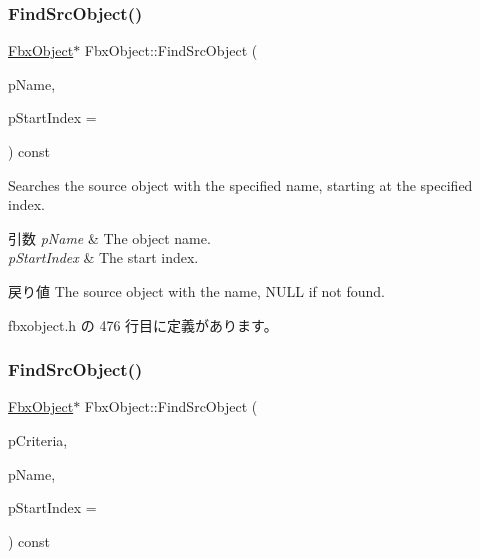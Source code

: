 \subsubsection{\texorpdfstring{Find\+Src\+Object()}{FindSrcObject()}\hspace{0.1cm}{\footnotesize\ttfamily [1/4]}}
{\footnotesize\ttfamily \hyperlink{class_fbx_object}{Fbx\+Object}$\ast$ Fbx\+Object\+::\+Find\+Src\+Object (\begin{DoxyParamCaption}\item[{const char $\ast$}]{p\+Name,  }\item[{int}]{p\+Start\+Index = {} }\end{DoxyParamCaption}) const\hspace{0.3cm}{\ttfamily [inline]}}

Searches the source object with the specified name, starting at the specified index. 
\begin{DoxyParams}{引数}
{\em p\+Name} & The object name. \\
\hline
{\em p\+Start\+Index} & The start index. \\
\hline
\end{DoxyParams}
\begin{DoxyReturn}{戻り値}
The source object with the name, N\+U\+LL if not found. 
\end{DoxyReturn}


 fbxobject.\+h の 476 行目に定義があります。

\mbox{\label{class_fbx_object_abc939951e2e0de886642e2845f72b71d}} 
\subsubsection{\texorpdfstring{Find\+Src\+Object()}{FindSrcObject()}\hspace{0.1cm}{\footnotesize\ttfamily [2/4]}}
{\footnotesize\ttfamily \hyperlink{class_fbx_object}{Fbx\+Object}$\ast$ Fbx\+Object\+::\+Find\+Src\+Object (\begin{DoxyParamCaption}\item[{const \hyperlink{class_fbx_criteria}{Fbx\+Criteria} \&}]{p\+Criteria,  }\item[{const char $\ast$}]{p\+Name,  }\item[{int}]{p\+Start\+Index = {} }\end{DoxyParamCaption}) const\hspace{0.3cm}{\ttfamily [inline]}}

